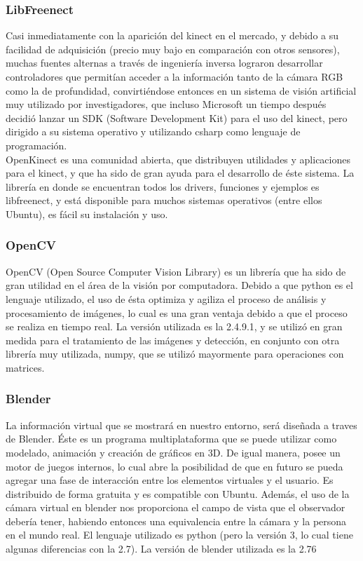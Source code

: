 \documentclass[a4paper,openright,12pt]{report}
\begin{document}
\subsubsection{LibFreenect}
Casi inmediatamente con la aparición del kinect en el mercado, y debido a su facilidad de adquisición (precio muy bajo en comparación con otros sensores), muchas fuentes alternas a través de ingeniería inversa lograron desarrollar controladores que permitían acceder a la información tanto de la cámara RGB como la de profundidad, convirtiéndose entonces en un sistema de visión artificial muy utilizado por investigadores, que incluso Microsoft un tiempo después decidió lanzar un SDK (Software Development Kit) para el uso del kinect, pero dirigido a su sistema operativo y utilizando csharp como lenguaje de programación.\\
OpenKinect es una comunidad abierta, que distribuyen utilidades y aplicaciones para el kinect, y que ha sido de gran ayuda para el desarrollo de éste sistema. La librería en donde se encuentran todos los drivers, funciones y ejemplos es libfreenect, y está disponible para muchos sistemas operativos (entre ellos Ubuntu), es fácil su instalación y uso.
\subsubsection{OpenCV}
OpenCV (Open Source Computer Vision Library) es un librería que ha sido de gran utilidad en el área de la visión por computadora. Debido a que python es el lenguaje utilizado, el uso de ésta optimiza y agiliza el proceso de análisis y procesamiento de imágenes, lo cual es una gran ventaja debido a que el proceso se realiza en tiempo real. La versión utilizada es la 2.4.9.1, y se utilizó en gran medida para el tratamiento de las imágenes y detección, en conjunto con otra librería muy utilizada, numpy, que se utilizó mayormente para operaciones con matrices.
\subsubsection{Blender}
La información virtual que se mostrará en nuestro entorno, será diseñada a traves de Blender. Éste es un programa multiplataforma que se puede utilizar como modelado, animación y creación de gráficos en 3D. De igual manera, posee un motor de juegos internos, lo cual abre la posibilidad de que en futuro se pueda agregar una fase de interacción entre los elementos virtuales y el usuario. Es distribuido de forma gratuita y es compatible con Ubuntu. Además, el uso de la cámara virtual en blender nos proporciona el campo de vista que el observador debería tener, habiendo entonces una equivalencia entre la cámara y la persona en el mundo real. El lenguaje utilizado es python (pero la versión 3, lo cual tiene algunas diferencias con la 2.7). La versión de blender utilizada es la 2.76 
\end{document}
